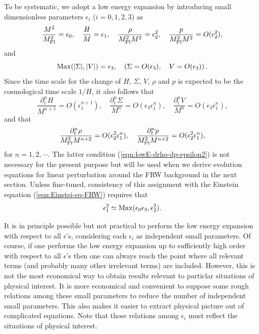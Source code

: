 To be systematic, we adopt a low energy expansion by introducing small
dimensionless parameters $\epsilon_i$ ($i=0,1,2,3$) as
%
\begin{equation}
 \frac{M^2}{M_{\rm Pl}^2} = \epsilon_0, \quad
 \frac{H}{M} = \epsilon_1, \quad
 \frac{\rho}{M_{\rm Pl}^2M^2} = \epsilon_2^2, \quad
 \frac{p}{M_{\rm Pl}^2M^2} = O(\epsilon_2^2),
\end{equation}
and 
%
\begin{equation}
 {\rm Max}(|\Sigma|,|V|)=\epsilon_3, \quad
  \left( \Sigma = O(\epsilon_3), \quad 
   V = O(\epsilon_3) \right).
\end{equation}
Since the time scale for the change of $H$, $\Sigma$, $V$, $\rho$ and
$p$ is expected to be the cosmological time scale $1/H$, it also follows
that
%
\begin{equation}
 \frac{\partial_t^nH}{M^{n+1}} = O(\epsilon_1^{n+1}), \quad
 \frac{\partial_t^n\Sigma}{M^n} = O(\epsilon_3\epsilon_1^n), \quad
 \frac{\partial_t^n V}{M^n} = O(\epsilon_3\epsilon_1^n), 
\end{equation}
and that
%
\begin{equation}
 \frac{\partial_t^n\rho}{M_{\rm Pl}^2M^{n+2}}
  = O(\epsilon_2^2\epsilon_1^n), \quad
 \frac{\partial_t^n p}{M_{\rm Pl}^2M^{n+2}}
 = O(\epsilon_2^2\epsilon_1^n),
 \label{eqn:lowE-drho-dp-epsilon2}
\end{equation}
for $n=1,2,\cdots$. The latter condition
(\ref{eqn:lowE-drho-dp-epsilon2}) is not necessary for the present
purpose but will be used when we derive evolution equations for linear
perturbation around the FRW background in the next section. Unless
fine-tuned, consistency of this assignment with the Einstein equation 
(\ref{eqn:Einstei-eq-FRW}) requires that 
%
\begin{equation}
 \epsilon_1^2 \simeq 
  {\rm Max} (\epsilon_0\epsilon_3,\epsilon_2^2).
  \label{eqn:consistency-epsilons}
\end{equation}


It is in principle possible but not practical to perform the low energy
expansion with respect to all $\epsilon$'s, considering each
$\epsilon_i$ as independent small parameters. Of course, if one performs 
the low energy expansion up to sufficiently high order with respect to
all $\epsilon$'s then one can always reach the point where all relevant
terms (and probably many other irrelevant terms) are included. However,
this is not the most economical way to obtain results relevant to
particlar situations of physical interest. It is more economical and
convenient to suppose some rough relations among these small parameters
to reduce the number of independent small parameters. This also makes it
easier to extract physical picture out of complicated equations. Note
that those relations among $\epsilon_i$ must reflect the situations of
physical  interest. 



